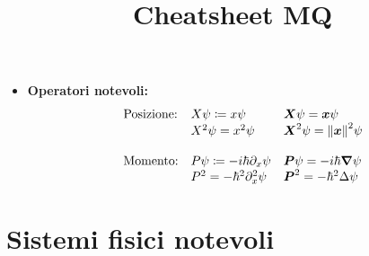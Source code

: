 \documentclass[a4paper,10pt]{article}
\title{\textbf{Cheatsheet MQ}}
\date{}
\theoremstyle{definition}
\newcommand{\bv}{\boldsymbol} %
\theoremstyle{indentdefinition}
\theoremstyle{indenttheorem}
\theoremstyle{myremark}
\theoremstyle{indentgeneral}
\begin{document}
\maketitle
\begin{itemize}
    \item \textbf{Operatori notevoli:}
    \begin{align*}
    \begin{array}{lll}
        \text{Posizione:}&X\psi\coloneqq x\psi & \bv{X}\psi=\bv{x}\psi  \\
       &X^2\psi=x^2\psi  & \bv{X}^2\psi=\norm{\bv{x}}^2\psi \\ \\
       \text{Momento:}&P\psi\coloneqq-i\hbar\partial_x\psi & \bv{P}\psi=-i\hbar\grad \psi\\
      & P^2=-\hbar^2\partial^2_x\psi & \bv{P}^2=-\hbar^2\Delta \psi
    \end{array}
\end{align*}
\end{itemize}

\part{Sistemi fisici notevoli}
\end{document}
